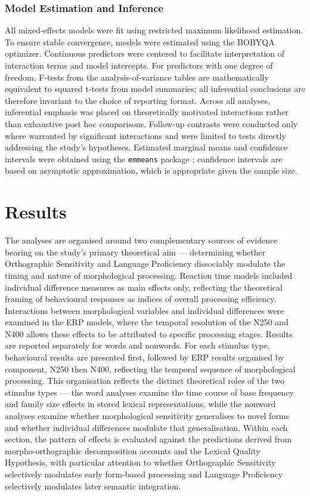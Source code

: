 \documentclass[utf8]{FrontiersinHarvard} %
\begin{document}
	\subsubsection{Model Estimation and Inference}
	All mixed-effects models were fit using restricted maximum likelihood estimation. To ensure stable convergence, models were estimated using the BOBYQA optimizer. Continuous predictors were centered to facilitate interpretation of interaction terms and model intercepts. For predictors with one degree of freedom, F-tests from the analysis-of-variance tables are mathematically equivalent to squared t-tests from model summaries; all inferential conclusions are therefore invariant to the choice of reporting format. Across all analyses, inferential emphasis was placed on theoretically motivated interactions rather than exhaustive post hoc comparisons. Follow-up contrasts were conducted only where warranted by significant interactions and were limited to tests directly addressing the study’s hypotheses. Estimated marginal means and confidence intervals were obtained using the \texttt{emmeans} package \citep{lenthEmmeansEstimatedMarginal2026}; confidence intervals are based on asymptotic approximation, which is appropriate given the sample size.
	
	\section{Results}
	
	The analyses are organised around two complementary sources of evidence bearing on the study's primary theoretical aim --- determining whether Orthographic Sensitivity and Language Proficiency dissociably modulate the timing and nature of morphological processing. Reaction time models included individual difference measures as main effects only, reflecting the theoretical framing of behavioural responses as indices of overall processing efficiency. Interactions between morphological variables and individual differences were examined in the ERP models, where the temporal resolution of the N250 and N400 allows these effects to be attributed to specific processing stages. Results are reported separately for words and nonwords. For each stimulus type, behavioural results are presented first, followed by ERP results organised by component, N250 then N400, reflecting the temporal sequence of morphological processing. This organisation reflects the distinct theoretical roles of the two stimulus types --- the word analyses examine the time course of base frequency and family size effects in stored lexical representations, while the nonword analyses examine whether morphological sensitivity generalises to novel forms and whether individual differences modulate that generalisation. Within each section, the pattern of effects is evaluated against the predictions derived from morpho-orthographic decomposition accounts and the Lexical Quality Hypothesis, with particular attention to whether Orthographic Sensitivity selectively modulates early form-based processing and Language Proficiency selectively modulates later semantic integration.
	
\end{document}
